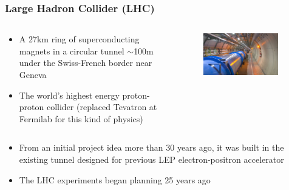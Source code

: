 \begin{frame}
\frametitle{Large Hadron Collider (LHC)}

\begin{columns}[T] %

\begin{column}{.50\textwidth}
\begin{itemize}
\item A 27km ring of superconducting magnets in a circular tunnel $\sim$100m under the Swiss-French border near Geneva
\item The world's highest energy proton-proton collider (replaced Tevatron at Fermilab for this kind of physics)
\end{itemize}
\end{column}%


\begin{column}{.50\textwidth}
\begin{figure}[htbp]
\begin{center}
\includegraphics[width=0.9\textwidth]{images/lhc-tunnel.png}
\end{center}
\end{figure}
\end{column}%

\end{columns}

\begin{itemize}
\item From an initial project idea more than 30 years ago, it was built in the existing tunnel designed for previous LEP electron-positron accelerator
\item The LHC experiments began planning 25 years ago
\end{itemize}



\end{frame}


